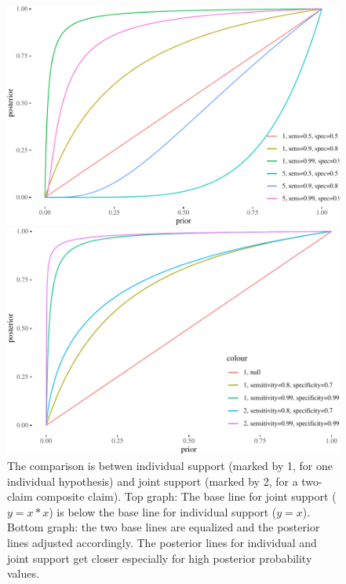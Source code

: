 \documentclass[
  10pt,
  dvipsnames,enabledeprecatedfontcommands]{scrartcl}
\begin{document}
\begin{figure}


\begin{center}\includegraphics[width=0.9\linewidth]{conjunction-paradox_files/figure-latex/unnamed-chunk-9-1} \end{center}



\begin{center}\includegraphics[width=0.9\linewidth]{conjunction-paradox_files/figure-latex/unnamed-chunk-10-1} \end{center}

\caption{The comparison is betwen individual support (marked by 1, for one individual 
hypothesis) and joint support (marked by 2, for a two-claim composite claim). 
Top graph: The base line for joint support ($y=x*x$) is 
below the base line for individual support ($y=x$).
Bottom graph: the two base lines are equalized and the 
posterior lines adjusted accordingly. The posterior 
lines for individual and joint support 
get closer especially for high posterior probability values.}
\label{fig:post-indiv-joint}
\end{figure}
\end{document}
